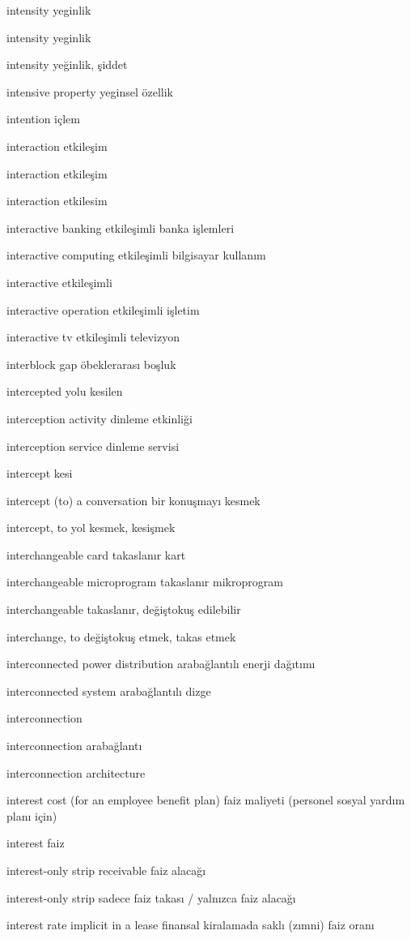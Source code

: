 \documentclass[12pt,fleqn]{article}\usepackage{../../common}
\begin{document}
intensity yeginlik

intensity yeginlik

intensity yeğinlik, şiddet

intensive property yeginsel özellik

intention içlem

interaction etkileşim

interaction etkileşim

interaction etkilesim

interactive banking etkileşimli banka işlemleri

interactive computing etkileşimli bilgisayar kullanım

interactive etkileşimli

interactive operation etkileşimli işletim

interactive tv etkileşimli televizyon

interblock gap öbeklerarası boşluk

intercepted yolu kesilen

interception activity dinleme etkinliği

interception service dinleme servisi

intercept kesi

intercept (to) a conversation bir konuşmayı kesmek

intercept, to yol kesmek, kesişmek

interchangeable card takaslanır kart

interchangeable microprogram takaslanır mikroprogram

interchangeable takaslanır, değiştokuş edilebilir

interchange, to değiştokuş etmek, takas etmek

interconnected power distribution arabağlantılı enerji dağıtımı

interconnected system arabağlantılı dizge

interconnection

interconnection arabağlantı

interconnection architecture

interest cost (for an employee benefit plan) faiz maliyeti (personel sosyal yardım planı için)

interest faiz

interest-only strip receivable faiz alacağı

interest-only strip sadece faiz takası / yalnızca faiz alacağı

interest rate implicit in a lease finansal kiralamada saklı (zımni) faiz oranı
\end{document}
